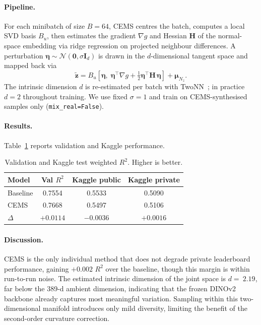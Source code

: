 \documentclass[10pt, a4paper]{article}
\begin{document}
\paragraph{Pipeline.}
For each minibatch of size $B{=}64$, CEMS centres the batch, computes a local
SVD basis $B_u$, then estimates the gradient $\nabla g$ and Hessian $\mathbf{H}$
of the normal-space embedding via ridge regression on projected neighbour
differences.  A perturbation $\boldsymbol{\eta}{\sim}\mathcal{N}(\mathbf{0},\sigma\mathbf{I}_d)$
is drawn in the $d$-dimensional tangent space and mapped back via
\begin{equation}
  \tilde{\mathbf{z}} = B_u\!\left[\boldsymbol{\eta},\;
    \boldsymbol{\eta}^{\!\top}\!\nabla g
    +\tfrac{1}{2}\boldsymbol{\eta}^{\!\top}\!\mathbf{H}\,\boldsymbol{\eta}
  \right] + \boldsymbol{\mu}_{N_z}.
\end{equation}
The intrinsic dimension $d$ is re-estimated per batch with
TwoNN~\citep{facco2017}; in practice $d{=}2$ throughout training.  We use fixed
$\sigma{=}1$ and train on CEMS-synthesised samples only (\texttt{mix\_real=False}).

\paragraph{Results.}
Table~\ref{tab:cems_results} reports validation and Kaggle performance.

\begin{table}[h]
  \centering
  \caption{Validation and Kaggle test weighted $R^2$. Higher is better.}
  \label{tab:cems_results}
  \begin{tabular}{lccc}
    \toprule
    \textbf{Model} & \textbf{Val $R^2$} & \textbf{Kaggle public} & \textbf{Kaggle private} \\
    \midrule
    Baseline & 0.7554 & 0.5533 & 0.5090 \\
    CEMS     & 0.7668 & 0.5497 & 0.5106 \\
    $\Delta$ & $+0.0114$ & $-0.0036$ & $+0.0016$ \\
    \bottomrule
  \end{tabular}
\end{table}

\paragraph{Discussion.}
CEMS is the only individual method that does not degrade private leaderboard
performance, gaining $+0.002$ $R^{2}$ over the baseline, though this margin is
within run-to-run noise. The estimated intrinsic dimension of the joint space
is $d{=}~2.19$, far below the 389-d ambient dimension, indicating that the frozen
DINOv2 backbone already captures most meaningful variation. Sampling within this
two-dimensional manifold introduces only mild diversity, limiting the benefit
of the second-order curvature correction.
\end{document}
